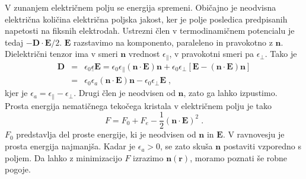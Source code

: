 V zunanjem električnem polju se energija spremeni. Običajno je neodvisna
električna količina električna poljska jakost, ker je polje posledica
predpisanih napetosti na fiksnih elektrodah. Ustrezni člen v termodinamičnem
potencialu je tedaj $-\mathbf{D}\cdot\mathbf{E}/2$. $\mathbf{E}$ razstavimo
na komponento, paraleleno in pravokotno z $\mathbf{n}$. Dielektrični
tenzor ima v smeri $\mathbf{n}$ vrednost $\epsilon_{\parallel}$, v
pravokotni smeri pa $\epsilon_{\perp}$. Tako je 
\begin{eqnarray}
\mathbf{D} & = & \epsilon_{0}\underline{\epsilon}\mathbf{E}=\epsilon_{0}\epsilon_{\parallel}(\mathbf{n}\cdot\mathbf{E})\mathbf{n}+\epsilon_{0}\epsilon_{\perp}[\mathbf{E}-(\mathbf{n}\cdot\mathbf{E})\mathbf{n}]\nonumber \\
 & = & \epsilon_{0}\epsilon_{a}(\mathbf{n}\cdot\mathbf{E})\mathbf{n}-\epsilon_{0}\epsilon_{\perp}\mathbf{E}\;,
\end{eqnarray}
 kjer je $\epsilon_{a}=\epsilon_{\parallel}-\epsilon_{\perp}$. Drugi
člen je neodvisen od $\mathbf{n}$, zato ga lahko izpustimo. Prosta energija
nematičnega tekočega kristala v električnem polju je tako 
\begin{equation}
F=F_{0}+F_{e}-\frac{1}{2}(\mathbf{n}\cdot\mathbf{E})^{2}\;.\label{7.72}
\end{equation}
 $F_{0}$ predstavlja del proste energije, ki je neodvisen od $\mathbf{n}$
in $\mathbf{E}$. V ravnovesju je prosta energija najmanjša. Kadar je
$\epsilon_{a}>0$, se zato skuša $\mathbf{n}$ postaviti vzporedno s
poljem. Da lahko z minimizacijo $F$ izrazimo $\mathbf{n}(\mathbf{r})$, moramo
poznati še robne pogoje.

